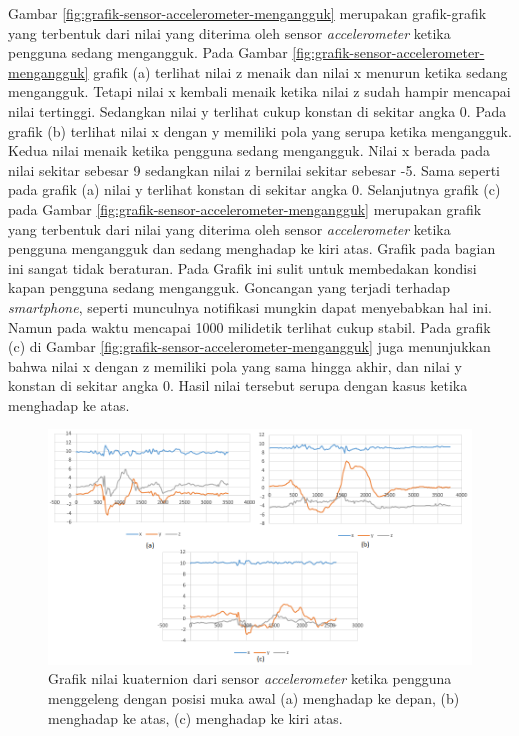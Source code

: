 Gambar \ref{fig:grafik-sensor-accelerometer-mengangguk} merupakan grafik-grafik yang terbentuk dari nilai yang diterima oleh sensor \textit{accelerometer} ketika pengguna sedang mengangguk. Pada Gambar \ref{fig:grafik-sensor-accelerometer-mengangguk} grafik (a) terlihat nilai z menaik dan nilai x menurun ketika sedang mengangguk. Tetapi nilai x kembali menaik ketika nilai z sudah hampir mencapai nilai tertinggi. Sedangkan nilai y terlihat cukup konstan di sekitar angka 0. Pada grafik (b) terlihat nilai x dengan y memiliki pola yang serupa ketika mengangguk. Kedua nilai menaik ketika pengguna sedang mengangguk. Nilai x berada pada nilai sekitar sebesar 9 sedangkan nilai z bernilai sekitar sebesar -5. Sama seperti pada grafik (a) nilai y terlihat konstan di sekitar angka 0. Selanjutnya grafik (c) pada Gambar \ref{fig:grafik-sensor-accelerometer-mengangguk} merupakan grafik yang terbentuk dari nilai yang diterima oleh sensor \textit{accelerometer} ketika pengguna mengangguk dan sedang menghadap ke kiri atas. Grafik pada bagian ini sangat tidak beraturan. Pada Grafik ini sulit untuk membedakan kondisi kapan pengguna sedang mengangguk. Goncangan yang terjadi terhadap \textit{smartphone}, seperti munculnya notifikasi mungkin dapat menyebabkan hal ini. Namun pada waktu mencapai 1000 milidetik terlihat cukup stabil. Pada grafik (c) di Gambar \ref{fig:grafik-sensor-accelerometer-mengangguk} juga menunjukkan bahwa nilai x dengan z memiliki pola yang sama hingga akhir, dan nilai y konstan di sekitar angka 0. Hasil nilai tersebut serupa dengan kasus ketika menghadap ke atas. 

\begin{figure}[htbp]
\centering
\includegraphics[scale=0.6]{Gambar/grafik-sensor-accelerometer-menggeleng.png}
\caption{Grafik nilai kuaternion dari sensor \textit{accelerometer} ketika pengguna menggeleng dengan posisi muka awal (a) menghadap ke depan, (b) menghadap ke atas, (c) menghadap ke kiri atas.} 
\label{fig:grafik-sensor-accelerometer-menggeleng}
\end{figure}

